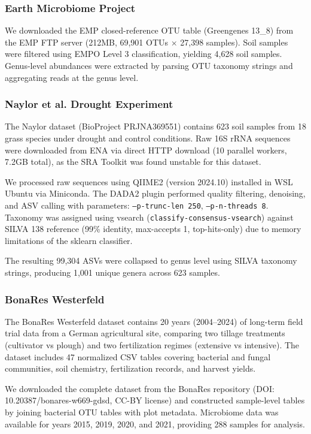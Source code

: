 \documentclass[11pt,a4paper]{article}
\begin{document}
\subsubsection{Earth Microbiome Project}

We downloaded the EMP closed-reference OTU table (Greengenes 13\_8) from the EMP FTP server (212MB, 69,901 OTUs $\times$ 27,398 samples). Soil samples were filtered using EMPO Level 3 classification, yielding 4,628 soil samples. Genus-level abundances were extracted by parsing OTU taxonomy strings and aggregating reads at the genus level.

\subsubsection{Naylor et al. Drought Experiment}

The Naylor dataset (BioProject PRJNA369551) contains 623 soil samples from 18 grass species under drought and control conditions. Raw 16S rRNA sequences were downloaded from ENA via direct HTTP download (10 parallel workers, 7.2GB total), as the SRA Toolkit was found unstable for this dataset.

We processed raw sequences using QIIME2 (version 2024.10) installed in WSL Ubuntu via Miniconda. The DADA2 plugin performed quality filtering, denoising, and ASV calling with parameters: \texttt{--p-trunc-len 250}, \texttt{--p-n-threads 8}. Taxonomy was assigned using vsearch (\texttt{classify-consensus-vsearch}) against SILVA 138 reference (99\% identity, max-accepts 1, top-hits-only) due to memory limitations of the sklearn classifier.

The resulting 99,304 ASVs were collapsed to genus level using SILVA taxonomy strings, producing 1,001 unique genera across 623 samples.

\subsubsection{BonaRes Westerfeld}

The BonaRes Westerfeld dataset contains 20 years (2004--2024) of long-term field trial data from a German agricultural site, comparing two tillage treatments (cultivator vs plough) and two fertilization regimes (extensive vs intensive). The dataset includes 47 normalized CSV tables covering bacterial and fungal communities, soil chemistry, fertilization records, and harvest yields.

We downloaded the complete dataset from the BonaRes repository (DOI: 10.20387/bonares-w669-gdsd, CC-BY license) and constructed sample-level tables by joining bacterial OTU tables with plot metadata. Microbiome data was available for years 2015, 2019, 2020, and 2021, providing 288 samples for analysis.
\end{document}
